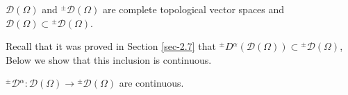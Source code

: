 \documentclass[leqno,final]{siamltex}
\numberwithin{equation}{section}
\renewcommand{\(}{\bigl(}
\renewcommand{\)}{\bigr)}
\begin{document}
    
   \begin{lemma}
      $\mathscr{D}(\Omega)$ and ${^{\pm}}{\mathscr{D}}(\Omega) $ are complete topological vector spaces
      and $\mathscr{D}(\Omega)\subset {^{\pm}}{\mathscr{D}(\Omega)} $.
   \end{lemma}

Recall that it was proved in Section \ref{sec-2.7} that 
${^{\pm}}{D}{^{\alpha}}(\mathscr{D}(\Omega)) \subset {^{\pm}}{\mathscr{D}}(\Omega) $,  
Below we show that this inclusion is continuous. 


\begin{proposition}\label{continuity}
	 ${^{\pm}}{\mathcal{D}}{^{\alpha}} : \mathscr{D}(\Omega)\to 
	 {^{\pm}}{\mathscr{D}}(\Omega)$ are continuous. 
\end{proposition}
\end{document}
